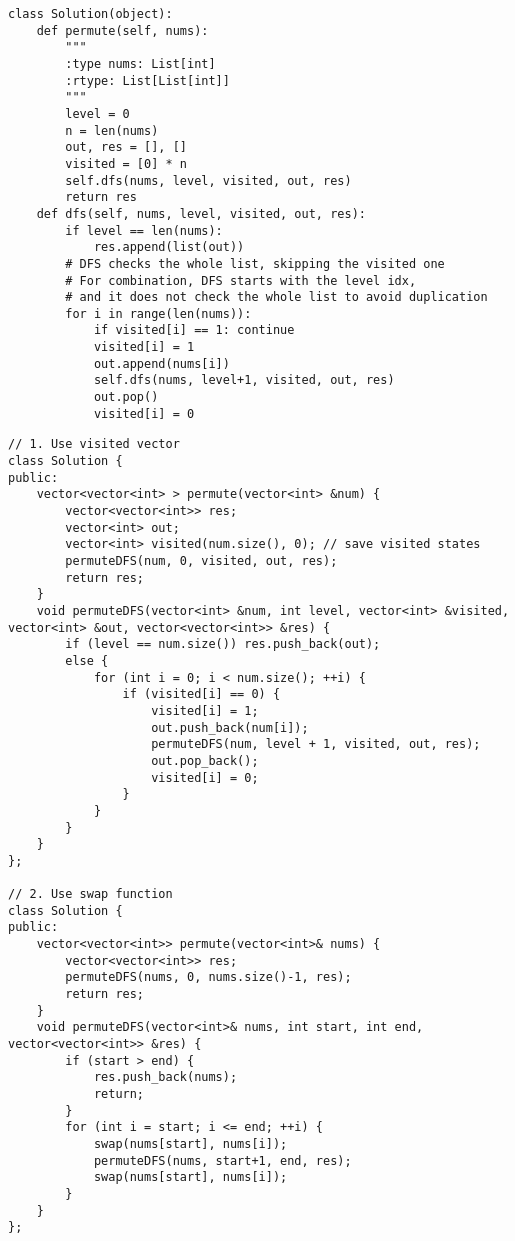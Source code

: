 \begin{lstlisting}
class Solution(object):
    def permute(self, nums):
        """
        :type nums: List[int]
        :rtype: List[List[int]]
        """
        level = 0
        n = len(nums)
        out, res = [], []
        visited = [0] * n
        self.dfs(nums, level, visited, out, res)
        return res
    def dfs(self, nums, level, visited, out, res):
        if level == len(nums):
            res.append(list(out))
        # DFS checks the whole list, skipping the visited one
        # For combination, DFS starts with the level idx, 
        # and it does not check the whole list to avoid duplication
        for i in range(len(nums)):
            if visited[i] == 1: continue
            visited[i] = 1
            out.append(nums[i])
            self.dfs(nums, level+1, visited, out, res)
            out.pop()
            visited[i] = 0
\end{lstlisting}

\begin{lstlisting}
// 1. Use visited vector
class Solution {
public:
    vector<vector<int> > permute(vector<int> &num) {
        vector<vector<int>> res;
        vector<int> out;
        vector<int> visited(num.size(), 0); // save visited states
        permuteDFS(num, 0, visited, out, res);
        return res;
    }
    void permuteDFS(vector<int> &num, int level, vector<int> &visited, vector<int> &out, vector<vector<int>> &res) {
        if (level == num.size()) res.push_back(out);
        else {
            for (int i = 0; i < num.size(); ++i) {
                if (visited[i] == 0) {
                    visited[i] = 1;
                    out.push_back(num[i]);
                    permuteDFS(num, level + 1, visited, out, res);
                    out.pop_back();
                    visited[i] = 0;
                }
            }
        }
    }
};

// 2. Use swap function
class Solution {
public:
    vector<vector<int>> permute(vector<int>& nums) {
        vector<vector<int>> res;
        permuteDFS(nums, 0, nums.size()-1, res);
        return res;
    }
    void permuteDFS(vector<int>& nums, int start, int end, vector<vector<int>> &res) {
        if (start > end) {
            res.push_back(nums);
            return;
        }
        for (int i = start; i <= end; ++i) {
            swap(nums[start], nums[i]);
            permuteDFS(nums, start+1, end, res);
            swap(nums[start], nums[i]);
        }
    }
};
\end{lstlisting}


